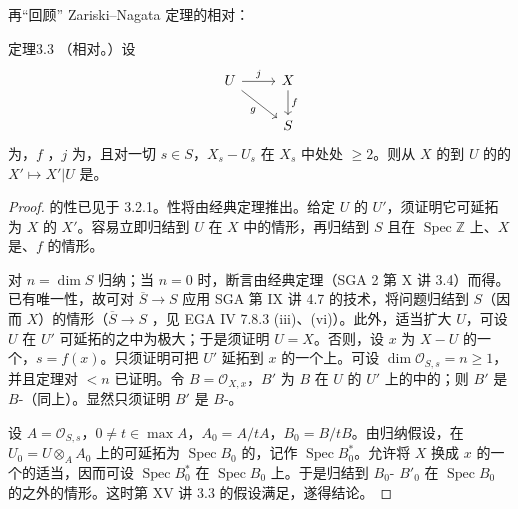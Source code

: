 再“回顾” Zariski--Nagata 定理的相对：
\begin{SGAresult}{定理}{3.3}
（相对。）设
\[
\begin{tikzcd}
U\arrow[r,"j"]\arrow[dr,"g"']&X\arrow[d,"f"]\\&S
\end{tikzcd}
\]
为，$f$ ，$j$ 为，且对一切 $s\in S$，$X_s-U_s$ 在 $X_s$ 中处处 $\geq2$。则从 $X$ 的到 $U$ 的的 $X'\mapsto X'|U$ 是。
\end{SGAresult}
\begin{proof}
的性已见于 3.2.1。性将由经典定理推出。给定 $U$ 的 $U'$，须证明它可延拓为 $X$ 的 $X'$。容易立即归结到 $U$ 在 $X$ 中的情形，再归结到 $S$ 且在 $\operatorname{Spec}\mathbb Z$ 上、$X$ 是、$f$ 的情形。

对 $n=\dim S$ 归纳；当 $n=0$ 时，断言由经典定理（SGA 2 第 X 讲 3.4）而得。已有唯一性，故可对 $\overline S\to S$ 应用 SGA 第 IX 讲 4.7 的技术，将问题归结到 $S$（因而 $X$）的情形（$\overline S\to S$ ，见 EGA IV 7.8.3 (iii)、(vi)）。此外，适当扩大 $U$，可设 $U$ 在 $U'$ 可延拓的之中为极大；于是须证明 $U=X$。否则，设 $x$ 为 $X-U$ 的一个，$s=f(x)$。只须证明可把 $U'$ 延拓到 $x$ 的一个上。可设 $\dim\mathcal O_{S,s}=n\geq1$，并且定理对 $<n$ 已证明。令 $B=\mathcal O_{X,x}$，$B'$ 为 $B$ 在 $U$ 的 $U'$ 上的中的；则 $B'$ 是 $B$-（同上）。显然只须证明 $B'$ 是 $B$-。

设 $A=\mathcal O_{S,s}$，$0\ne t\in\operatorname{max}A$，$A_0=A/tA$，$B_0=B/tB$。由归纳假设，在 $U_0=U\otimes_AA_0$ 上的可延拓为 $\operatorname{Spec}B_0$ 的，记作 $\operatorname{Spec}B_0^*$。允许将 $X$ 换成 $x$ 的一个的适当，因而可设 $\operatorname{Spec}B_0^*$ 在 $\operatorname{Spec}B_0$ 上。于是归结到 $B_0$- $B'_0$ 在 $\operatorname{Spec}B_0$ 的之外的情形。这时第 XV 讲 3.3 的假设满足，遂得结论。
\end{proof}
